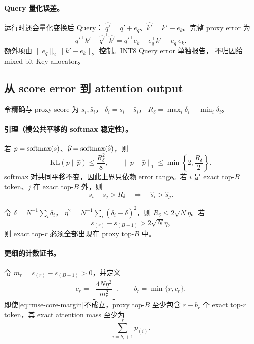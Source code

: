 \paragraph{Query 量化误差。}
运行时还会量化变换后 Query：
$\widehat{q'}=q'+e_q$、$\widehat{k'}=k'-e_k$。完整 proxy error 为
\begin{equation}
 {q'}^\top k'-{\widehat{q'}}^\top\widehat{k'}
 ={q'}^\top e_k-e_q^\top k'+e_q^\top e_k.
 \label{eq:query-key-quant-error}
\end{equation}
额外项由 $\|e_q\|_2\|k'-e_k\|_2$ 控制。INT8 Query error 单独报告，
不归因给 mixed-bit Key allocator。

\subsection{从 score error 到 attention output}

令精确与 proxy score 为 $s_i,\widehat s_i$，
$\delta_i=s_i-\widehat s_i$，
$R_\delta=\max_i\delta_i-\min_i\delta_i$。

\paragraph{引理（模公共平移的 softmax 稳定性）。}
若 $p=\operatorname{softmax}(s)$、$\widehat p=\operatorname{softmax}(\widehat s)$，则
\begin{equation}
 \mathrm{KL}(p\|\widehat p)\le\frac{R_\delta^2}{8},\qquad
 \|p-\widehat p\|_1\le
 \min\left\{2,\frac{R_\delta}{2}\right\}.
 \label{eq:softmax-range-bound}
\end{equation}
softmax 对共同平移不变，因此上界只依赖 error range。若 $i$ 是 exact
top-$B$ token、$j$ 在 exact top-$B$ 外，则
\begin{equation}
 s_i-s_j>R_\delta\quad\Longrightarrow\quad
 \widehat s_i>\widehat s_j.
 \label{eq:ranking-margin}
\end{equation}

令 $\bar\delta=N^{-1}\sum_i\delta_i$，
$\eta^2=N^{-1}\sum_i(\delta_i-\bar\delta)^2$，则
$R_\delta\le2\sqrt N\eta$。若
\begin{equation}
 s_{(r)}-s_{(B+1)}>2\sqrt N\eta,
 \label{eq:rmse-core-margin}
\end{equation}
则 exact top-$r$ 必须全部出现在 proxy top-$B$ 中。

\paragraph{更细的计数证书。}
令 $m_r=s_{(r)}-s_{(B+1)}>0$，并定义
\begin{equation}
 c_r=\left\lfloor\frac{4N\eta^2}{m_r^2}\right\rfloor,\qquad
 b_r=\min\{r,c_r\}.
 \label{eq:rmse-bad-count}
\end{equation}
即使\cref{eq:rmse-core-margin}不成立，proxy top-$B$ 至少包含
$r-b_r$ 个 exact top-$r$ token，其 exact attention mass 至少为
\begin{equation}
 \sum_{i=b_r+1}^{r}p_{(i)}.
 \label{eq:rmse-mass-count}
\end{equation}


